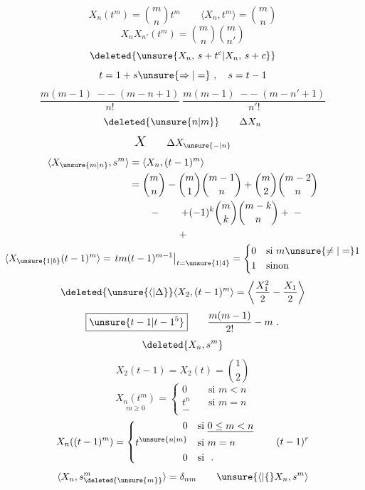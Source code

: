 \[
X_n(t^m)=\binom mn t^m\qquad\langle X_n,t^m\rangle=\binom mn
\]
\[X_nX_{n'}(t^m)=\binom mn\binom m{n'}\]
\[\deleted{\unsure{X_n,\,s+t^c|X_n,\,s+c}}\]
\[t=1+s\unsure{\Rightarrow|=}\ ,\quad s=t-1\]
\[
\frac{m(m-1)\;--\;(m-n+1)}{n!}\ \frac{m(m-1)\;--\;(m-n'+1)}{n'!}
\]
\[\deleted{\unsure{n|m}}\qquad\Delta X_n\]
\[\mbox{\Large$X$}\qquad\Delta X_{\unsure{-|n}}\]
\[
\begin{aligned}
\langle X_{\unsure{m|n}},s^m\rangle&=\langle X_n,(t-1)^m\rangle\\
&=\binom mn-\binom m1\binom{m-1}n+\binom m2\binom{m-2}n\\
&\qquad-\qquad+(-1)^k\binom mk\binom{m-k}n+\;-
\end{aligned}
\]
\[+\]
\[
\langle X_{\unsure{1|b}}(t-1)^m\rangle=\left.tm(t-1)^{m-1}\right|_{t=\unsure{1|4}}
=\left\{\begin{aligned}
0&\quad\text{si }m\unsure{\ne|=}1\\
1&\quad\text{sinon}
\end{aligned}\right.
\]
\[
\deleted{\unsure{\langle|\Delta}}\langle X_2,(t-1)^m\rangle=\left\langle\frac{X_1^2}{2}-\frac{X_1}{2}\right\rangle
\]
\[\boxed{\unsure{t-1|t-1^5}}\qquad\frac{m(m-1)}{2!}-m\ .\]
\[\deleted{X_n,s^m}\]
\[X_2(t-1)=X_2(t)=\binom12\]
\[
\underset{m\geq0}{X_n(t^m)}=\left\{\begin{aligned}
0&\quad\text{si }m<n\\
t^n&\quad\text{si }m=n\\
-&
\end{aligned}\right.
\]
\[
X_n((t-1)^m)=\left\{\begin{aligned}
0&\quad\text{si }\underline{0\leq m<n}\\
t^{\unsure{n|m}}&\quad\text{si }m=n\\
0&\quad\text{si }\ .
\end{aligned}\right.
\qquad(t-1)^r
\]
\[\langle X_n,s_{\deleted{\unsure{m}}}^{m}\rangle=\delta_{nm}\qquad\unsure{\langle|\{}X_n,s^m\rangle\]
